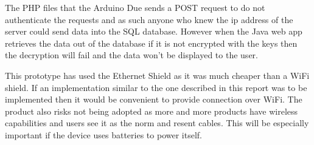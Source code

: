 The PHP files that the Arduino Due sends a POST request to do not authenticate the requests and as such anyone who knew the ip address of the server could send data into the SQL database. However when the Java web app retrieves the data out of the database if it is not encrypted with the keys then the decryption will fail and the data won't be displayed to the user.

This prototype has used the Ethernet Shield as it was much cheaper than a WiFi shield. If an implementation similar to the one described in this report was to be implemented then it would be convenient to provide connection over WiFi. The product also risks not being adopted as more and more products have wireless capabilities and  users see it as the norm and resent cables. This will be especially important if the device uses batteries to power itself.

